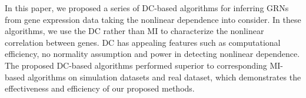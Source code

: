 \documentclass{bioinfo}
\begin{document}
In this paper, we proposed a series of  DC-based algorithms for
inferring GRNs from gene expression data taking the nonlinear
dependence into consider. In these algorithms, we use the DC rather
than MI to characterize the nonlinear correlation between genes. DC
has appealing features such as computational efficiency, no
normality assumption and power in detecting nonlinear dependence.
The proposed DC-based algorithms performed superior to corresponding
MI-based algorithms on simulation datasets and real dataset, which
demonstrates the effectiveness and efficiency of our proposed
methods.



%
%
%
%
%
%


\end{document}
